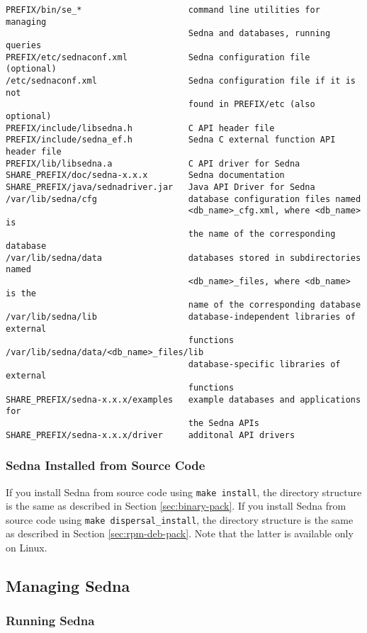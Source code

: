 \documentclass[a4paper,12pt]{article}
\begin{document}
\begin{verbatim}
PREFIX/bin/se_*                     command line utilities for managing 
                                    Sedna and databases, running queries
PREFIX/etc/sednaconf.xml            Sedna configuration file (optional)
/etc/sednaconf.xml                  Sedna configuration file if it is not 
                                    found in PREFIX/etc (also optional)
PREFIX/include/libsedna.h           C API header file
PREFIX/include/sedna_ef.h           Sedna C external function API header file
PREFIX/lib/libsedna.a               C API driver for Sedna
SHARE_PREFIX/doc/sedna-x.x.x        Sedna documentation
SHARE_PREFIX/java/sednadriver.jar   Java API Driver for Sedna
/var/lib/sedna/cfg                  database configuration files named 
                                    <db_name>_cfg.xml, where <db_name> is
                                    the name of the corresponding database
/var/lib/sedna/data                 databases stored in subdirectories named
                                    <db_name>_files, where <db_name> is the 
                                    name of the corresponding database
/var/lib/sedna/lib                  database-independent libraries of external 
                                    functions
/var/lib/sedna/data/<db_name>_files/lib
                                    database-specific libraries of external
                                    functions
SHARE_PREFIX/sedna-x.x.x/examples   example databases and applications for 
                                    the Sedna APIs
SHARE_PREFIX/sedna-x.x.x/driver     additonal API drivers 
\end{verbatim}

\subsubsection{Sedna Installed from Source Code}
If you install Sedna from source code using \verb!make install!, the directory structure is the same as described in Section \ref{sec:binary-pack}.
If you install Sedna from source code using \verb!make dispersal_install!, the directory structure is the same as described in Section \ref{sec:rpm-deb-pack}. Note that the latter is available only on Linux. 

\subsection{Managing Sedna}
\subsubsection{Running Sedna}
\label{StartSedna}
\end{document}
